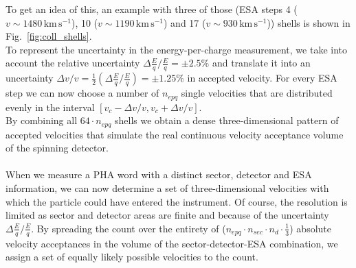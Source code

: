 To get an idea of this, an example with three of those (ESA steps 4 ($v \sim 1480 \,\mathrm{km\,s^{-1}}$), 10 ($v \sim 1190 \,\mathrm{km\,s^{-1}}$) and 17 ($v \sim 930 \,\mathrm{km\,s^{-1}}$)) shells is shown in Fig.~\ref{fig:coll_shells}.\\
To represent the uncertainty in the energy-per-charge measurement, we take into account the relative uncertainty $\Delta \frac{E}{q}/\frac{E}{q} = \pm 2.5\%$ \citep{gloeckler_1992} and translate it into an uncertainty $\Delta v / v = \frac{1}{2} \left( \Delta \frac{E}{q}/\frac{E}{q}\right) = \pm 1.25\%$ in accepted velocity. For every ESA step we can now choose a number of $n_{epq}$ single velocities that are distributed evenly in the interval $\left[ v_c - \Delta v / v, v_c + \Delta v / v \right]$. %
\\
By combining all $64 \cdot n_{epq}$ shells we obtain a dense three-dimensional pattern of accepted velocities that simulate the real continuous velocity acceptance volume of the spinning detector.
\\ \\
When we measure a PHA word with a distinct sector, detector and ESA information, we can now determine a set of three-dimensional velocities with which the particle could have entered the instrument. Of course, the resolution is limited as sector and detector areas are finite and because of the uncertainty $\Delta \frac{E}{q}/\frac{E}{q}$. By spreading the count over the entirety of ($n_{epq}\cdot n_{sec} \cdot n_{d} \cdot \frac{1}{3}$) absolute velocity acceptances in the volume of the sector-detector-ESA combination, we assign a set of equally likely possible velocities to the count.
%
%
%
